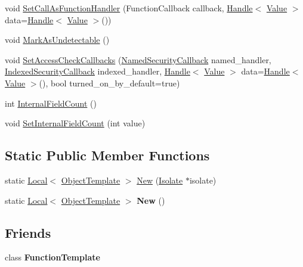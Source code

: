\begin{DoxyCompactItemize}
\item 
void \hyperlink{classv8_1_1ObjectTemplate_a5a7c6acbee1a04deb7c2cd43896b34ac}{Set\-Call\-As\-Function\-Handler} (Function\-Callback callback, \hyperlink{classv8_1_1Handle}{Handle}$<$ \hyperlink{classv8_1_1Value}{Value} $>$ data=\hyperlink{classv8_1_1Handle}{Handle}$<$ \hyperlink{classv8_1_1Value}{Value} $>$())
\item 
void \hyperlink{classv8_1_1ObjectTemplate_a7e40ef313b44c2ad336c73051523b4f8}{Mark\-As\-Undetectable} ()
\item 
void \hyperlink{classv8_1_1ObjectTemplate_acd0c47ecc715fa1256dc95524a4e8608}{Set\-Access\-Check\-Callbacks} (\hyperlink{namespacev8_a43a0aeee2c3f33b123957ec1273c87db}{Named\-Security\-Callback} named\-\_\-handler, \hyperlink{namespacev8_ad216c79f4f23bceefdb1469ad4ee65cd}{Indexed\-Security\-Callback} indexed\-\_\-handler, \hyperlink{classv8_1_1Handle}{Handle}$<$ \hyperlink{classv8_1_1Value}{Value} $>$ data=\hyperlink{classv8_1_1Handle}{Handle}$<$ \hyperlink{classv8_1_1Value}{Value} $>$(), bool turned\-\_\-on\-\_\-by\-\_\-default=true)
\item 
int \hyperlink{classv8_1_1ObjectTemplate_a43de785d594d8c01b18230b1aa79e31c}{Internal\-Field\-Count} ()
\item 
void \hyperlink{classv8_1_1ObjectTemplate_ab63916ac584a76bca8ba541f86ce9fce}{Set\-Internal\-Field\-Count} (int value)
\end{DoxyCompactItemize}
\subsection*{Static Public Member Functions}
\begin{DoxyCompactItemize}
\item 
static \hyperlink{classv8_1_1Local}{Local}$<$ \hyperlink{classv8_1_1ObjectTemplate}{Object\-Template} $>$ \hyperlink{classv8_1_1ObjectTemplate_a2b5c18f57d24b4cfea00dd752ee78c86}{New} (\hyperlink{classv8_1_1Isolate}{Isolate} $\ast$isolate)
\item 
\hypertarget{classv8_1_1ObjectTemplate_a394801526a9e9eb6df349a0eb8dfa0d0}{static \hyperlink{classv8_1_1Local}{Local}$<$ \hyperlink{classv8_1_1ObjectTemplate}{Object\-Template} $>$ {\bfseries New} ()}\label{classv8_1_1ObjectTemplate_a394801526a9e9eb6df349a0eb8dfa0d0}

\end{DoxyCompactItemize}
\subsection*{Friends}
\begin{DoxyCompactItemize}
\item 
\hypertarget{classv8_1_1ObjectTemplate_a334168ad1a5f39cf17b818ca3356aacd}{class {\bfseries Function\-Template}}\label{classv8_1_1ObjectTemplate_a334168ad1a5f39cf17b818ca3356aacd}

\end{DoxyCompactItemize}


